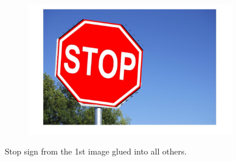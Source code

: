 \documentclass[a4paper]{iacas}
\begin{document}
\begin{figure}[!htbp]
\begin{subfigure}[b]{0.32\textwidth}
		\includegraphics[width=\textwidth]{604.jpg}
		\caption{}
		\label{fig:604}
	\end{subfigure}
	
	\caption{Stop sign from the 1st image glued into all others.}
	\label{fig:600}
\end{figure}
\end{document}

